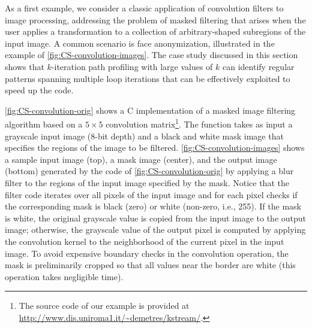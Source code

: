 As a first example, we consider a classic application of convolution filters to image processing, addressing the problem of masked filtering that arises when the user applies a transformation to a collection of arbitrary-shaped subregions of the input image. A common scenario is face anonymization, illustrated in the example of \myfigure\ref{fig:CS-convolution-images}. The case study discussed in this section shows that $k$-iteration path profiling with large values of $k$ can identify regular patterns spanning multiple loop iterations that can be effectively exploited to speed up the code. 

\myfigure\ref{fig:CS-convolution-orig} shows a C implementation of a masked image filtering algorithm based on a $5\times 5$ convolution matrix\footnote{The source code of our example is provided at \url{http://www.dis.uniroma1.it/~demetres/kstream/}.}. The function takes as input a grayscale input image (8-bit depth) and a black and white mask image that specifies the regions of the image to be filtered. \myfigure\ref{fig:CS-convolution-images} shows a sample input image (top), a mask image (center), and the output image (bottom) generated by the code of \myfigure\ref{fig:CS-convolution-orig} by applying a blur filter to the regions of the input image specified by the mask. Notice that the filter code iterates over all pixels of the input image and for each pixel checks if the corresponding mask is black (zero) or white (non-zero, i.e., 255). If the mask is white, the original grayscale value is copied from the input image to the output image; otherwise, the grayscale value of the output pixel is computed by applying the convolution kernel to the neighborhood of the current pixel in the input image. To avoid expensive boundary checks in the convolution operation, the mask is preliminarily cropped so that all values near the border are white (this operation takes negligible time).

